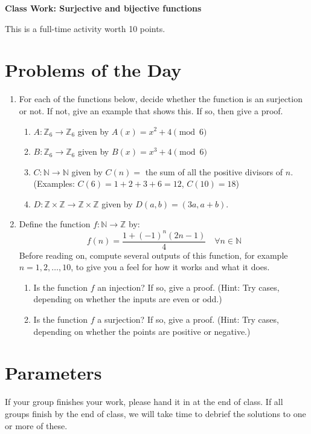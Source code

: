 \documentclass[11pt]{article}
\begin{document}
	
	\thispagestyle{empty}
	\renewcommand{\headrulewidth}{0.0pt}
	\thispagestyle{fancy}
	\lfoot{}
	\cfoot{}
	\rfoot{}	
	
	\vspace*{0in}

		\begin{center}
			\begin{large}
			\textbf{Class Work: Surjective and bijective functions} \\
			\end{large}
			This is a full-time activity worth 10 points. 
			
		\end{center}
		

\section*{Problems of the Day}


\begin{enumerate}
	\item For each of the functions below, decide whether the function is an surjection or not. If not, give an example that shows this. If so, then give a proof. 
	\begin{enumerate}
		\item $A: \mathbb{Z}_6 \rightarrow \mathbb{Z}_6$ given by $A(x) = x^2 + 4 \pmod 6$
		\item $B: \mathbb{Z}_6 \rightarrow \mathbb{Z}_6$ given by $B(x) = x^3 + 4 \pmod 6$
		\item $C: \mathbb{N} \rightarrow \mathbb{N}$ given by $C(n) = $ the sum of all the positive divisors of $n$. (Examples: $C(6) = 1 + 2 + 3 + 6 = 12$, $C(10)=18$)
		\item $D: \mathbb{Z} \times \mathbb{Z} \rightarrow \mathbb{Z} \times \mathbb{Z} $ given by $D(a,b) = (3a, a + b)$.
	\end{enumerate}
	
	\item Define the function $f: \mathbb{N} \rightarrow \mathbb{Z}$ by: 
	\[ f(n) = \frac{1 + (-1)^n(2n-1)}{4} \quad \forall n \in \mathbb{N} \]
	Before reading on, compute several outputs of this function, for example $n = 1, 2, \dots, 10$, to give you a feel for how it works and what it does. 
	\begin{enumerate}
		\item Is the function $f$ an injection? If so, give a proof. (Hint: Try cases, depending on whether the inputs are even or odd.) 
		\item Is the function $f$ a surjection? If so, give a proof. (Hint: Try cases, depending on whether the points are positive or negative.) 
	\end{enumerate}

 

\end{enumerate}

\section*{Parameters}

If your group finishes your work, please hand it in at the end of class. If all groups finish by the end of class, we will take time to debrief the solutions to one or more of these. 
\end{document}
